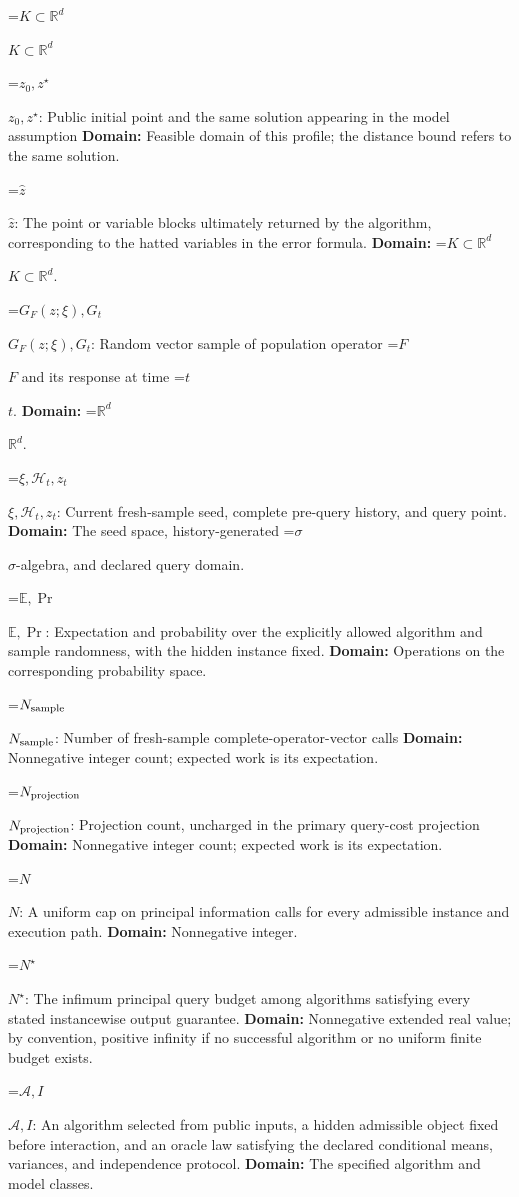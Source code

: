 \documentclass[10pt,a4paper]{article}
\newcommand{\AtlasMath}[1]{\par\begingroup\centering\setbox0=\hbox{$\displaystyle #1$}\ifdim\wd0>1.4\linewidth\typeout{ATLAS WIDE FORMULA: \the\wd0}\fi\ifdim\wd0>\linewidth\resizebox{\linewidth}{!}{\box0}\else\box0\fi\par\endgroup}
\newcommand{\AtlasInlineMath}[1]{\begingroup\setbox0=\hbox{$#1$}\ifdim\wd0>.4\linewidth\endgroup\AtlasMath{#1}\else\endgroup$#1$\fi}
\begin{document}
\AtlasInlineMath{K\subset\mathbb R^d}

\AtlasInlineMath{z_0,z^\star}: Public initial point and the same solution appearing in the model assumption \textbf{Domain:} Feasible domain of this profile; the distance bound refers to the same solution.

\AtlasInlineMath{\widehat z}: The point or variable blocks ultimately returned by the algorithm, corresponding to the hatted variables in the error formula. \textbf{Domain:} \AtlasInlineMath{K\subset\mathbb R^d}.

\AtlasInlineMath{G_F(z;\xi),G_t}: Random vector sample of population operator \AtlasInlineMath{F} and its response at time \AtlasInlineMath{t}. \textbf{Domain:} \AtlasInlineMath{\mathbb R^d}.

\AtlasInlineMath{\xi,\mathcal H_t,z_t}: Current fresh-sample seed, complete pre-query history, and query point. \textbf{Domain:} The seed space, history-generated \AtlasInlineMath{\sigma}-algebra, and declared query domain.

\AtlasInlineMath{\mathbb E,\Pr}: Expectation and probability over the explicitly allowed algorithm and sample randomness, with the hidden instance fixed. \textbf{Domain:} Operations on the corresponding probability space.

\AtlasInlineMath{N_{\rm sample}}: Number of fresh-sample complete-operator-vector calls \textbf{Domain:} Nonnegative integer count; expected work is its expectation.

\AtlasInlineMath{N_{\rm projection}}: Projection count, uncharged in the primary query-cost projection \textbf{Domain:} Nonnegative integer count; expected work is its expectation.

\AtlasInlineMath{N}: A uniform cap on principal information calls for every admissible instance and execution path. \textbf{Domain:} Nonnegative integer.

\AtlasInlineMath{N^\star}: The infimum principal query budget among algorithms satisfying every stated instancewise output guarantee. \textbf{Domain:} Nonnegative extended real value; by convention, positive infinity if no successful algorithm or no uniform finite budget exists.

\AtlasInlineMath{\mathcal A,I}: An algorithm selected from public inputs, a hidden admissible object fixed before interaction, and an oracle law satisfying the declared conditional means, variances, and independence protocol. \textbf{Domain:} The specified algorithm and model classes.
\end{document}
